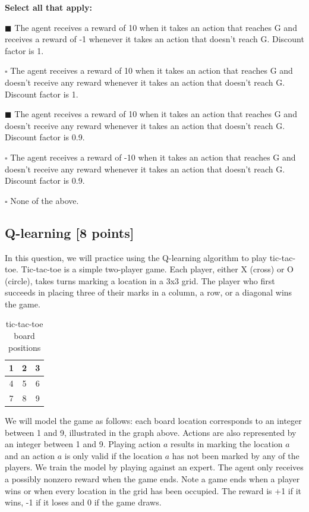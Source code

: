 \documentclass[11pt]{article}
\numberwithin{equation}{section} %
\numberwithin{figure}{section} %
\numberwithin{table}{section} %
\newcommand{\points}[1]{{\bf [#1 points]}}
\begin{document}
\begin{enumerate}
\textbf{Select all that apply:}
\begin{list}{}
    \item $\blacksquare$ The agent receives a reward of 10 when it takes an action that reaches G and receives a reward of -1 whenever it takes an action that doesn't reach G. Discount factor is 1.
    \item $\square$ The agent receives a reward of 10 when it takes an action that reaches G and doesn't receive any reward whenever it takes an action that doesn't reach G. Discount factor is 1.
    \item $\blacksquare$ The agent receives a reward of 10 when it takes an action that reaches G and doesn't receive any reward whenever it takes an action that doesn't reach G. Discount factor is 0.9.
    \item $\square$ The agent receives a reward of -10 when it takes an action that reaches G and doesn't receive any reward whenever it takes an action that doesn't reach G. Discount factor is 0.9.
    \item $\square$ None of the above.
\end{list}

\end{enumerate}

\clearpage

\subsection{Q-learning \points{8}}
In this question, we will practice using the Q-learning algorithm to play tic-tac-toe. Tic-tac-toe is a simple two-player game. Each player, either X (cross) or O (circle), takes turns marking a location in a 3x3 grid. The player who first succeeds in placing three of their marks in a column, a row, or a diagonal wins the game.

\begin{table}[H]
\begin{center}
  \begin{tabular}{  c | c | c  }
    1 & 2 & 3\\ \hline
    4 & 5 & 6 \\ \hline
    7 & 8 & 9 \\ 
  \end{tabular}
 \caption{tic-tac-toe board positions}
\end{center}
\end{table}

We will model the game as follows: each board location corresponds to an integer between 1 and 9, illustrated in the graph above. Actions are also represented by an integer between 1 and 9. Playing action $a$ results in marking the location $a$ and an action $a$ is only valid if the location $a$ has not been marked by any of the players. We train the model by playing against an expert. The agent only receives a possibly nonzero reward when the game ends. Note a game ends when a player wins or when every location in the grid has been occupied. The reward is +1 if it wins, -1 if it loses and 0 if the game draws.
\end{document}
